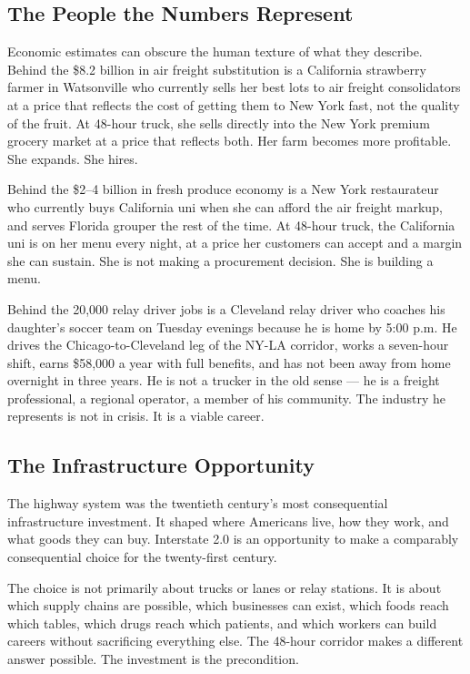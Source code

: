 \subsection*{The People the Numbers Represent}

Economic estimates can obscure the human texture of what they describe. Behind the \$8.2 billion
in air freight substitution is a California strawberry farmer in Watsonville who currently
sells her best lots to air freight consolidators at a price that reflects the cost of
getting them to New York fast, not the quality of the fruit. At 48-hour truck, she sells
directly into the New York premium grocery market at a price that reflects both. Her farm
becomes more profitable. She expands. She hires.

Behind the \$2--4 billion in fresh produce economy is a New York restaurateur who currently
buys California uni when she can afford the air freight markup, and serves Florida grouper
the rest of the time. At 48-hour truck, the California uni is on her menu every night,
at a price her customers can accept and a margin she can sustain. She is not making a
procurement decision. She is building a menu.

Behind the 20,000 relay driver jobs is a Cleveland relay driver who coaches his daughter's
soccer team on Tuesday evenings because he is home by 5:00 p.m. He drives the Chicago-to-Cleveland
leg of the NY-LA corridor, works a seven-hour shift, earns \$58,000 a year with full benefits,
and has not been away from home overnight in three years. He is not a trucker in the
old sense --- he is a freight professional, a regional operator, a member of his community.
The industry he represents is not in crisis. It is a viable career.

\subsection*{The Infrastructure Opportunity}

The highway system was the twentieth century's most consequential infrastructure investment.
It shaped where Americans live, how they work, and what goods they can buy. Interstate 2.0
is an opportunity to make a comparably consequential choice for the twenty-first century.

The choice is not primarily about trucks or lanes or relay stations. It is about which
supply chains are possible, which businesses can exist, which foods reach which tables,
which drugs reach which patients, and which workers can build careers without sacrificing
everything else. The 48-hour corridor makes a different answer possible. The investment
is the precondition.

